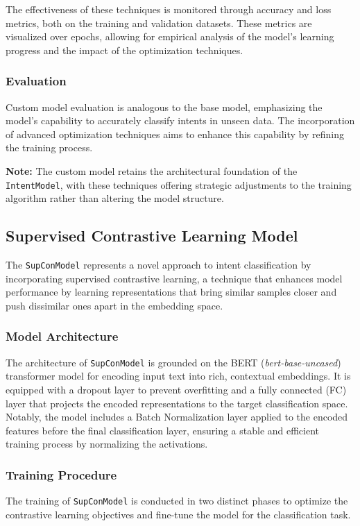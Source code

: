 The effectiveness of these techniques is monitored through accuracy and loss metrics, both on the training and validation datasets. These metrics are visualized over epochs, allowing for empirical analysis of the model's learning progress and the impact of the optimization techniques.

\subsubsection*{Evaluation}
Custom model evaluation is analogous to the base model, emphasizing the model's capability to accurately classify intents in unseen data. The incorporation of advanced optimization techniques aims to enhance this capability by refining the training process.

\textbf{Note:} The custom model retains the architectural foundation of the \texttt{IntentModel}, with these techniques offering strategic adjustments to the training algorithm rather than altering the model structure.


\subsection*{Supervised Contrastive Learning Model}

The \texttt{SupConModel} represents a novel approach to intent classification by incorporating supervised contrastive learning, a technique that enhances model performance by learning representations that bring similar samples closer and push dissimilar ones apart in the embedding space.

\subsubsection*{Model Architecture}
The architecture of \texttt{SupConModel} is grounded on the BERT (\textit{bert-base-uncased}) transformer model for encoding input text into rich, contextual embeddings. It is equipped with a dropout layer to prevent overfitting and a fully connected (FC) layer that projects the encoded representations to the target classification space. Notably, the model includes a Batch Normalization layer applied to the encoded features before the final classification layer, ensuring a stable and efficient training process by normalizing the activations.

\subsubsection*{Training Procedure}
The training of \texttt{SupConModel} is conducted in two distinct phases to optimize the contrastive learning objectives and fine-tune the model for the classification task.

